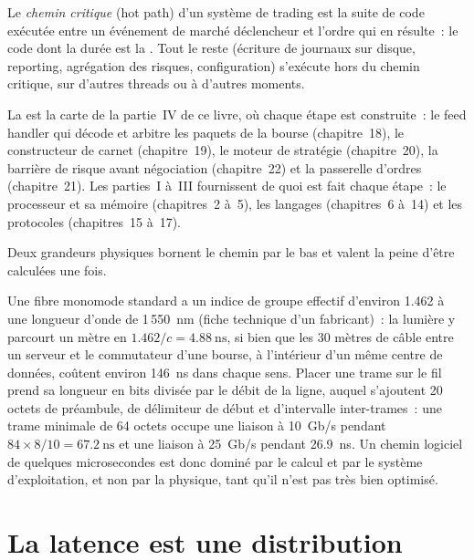 \begin{definition}\label{def:ll:where-latency-comes-from:hot}
Le \emph{chemin critique} (hot path) d'un système de trading est la suite de code exécutée entre un événement de marché déclencheur
et l'ordre qui en résulte~: le code dont la durée est la . Tout le reste (écriture de journaux sur disque, reporting, agrégation des risques, configuration)
s'exécute hors du chemin critique, sur d'autres threads ou à d'autres moments.
\end{definition}

La  est la carte de la partie~IV de ce livre, où chaque étape est construite~:
le feed handler qui décode et arbitre les paquets de la bourse (chapitre~18), le constructeur de carnet (chapitre~19),
le moteur de stratégie (chapitre~20), la barrière de risque avant négociation (chapitre~22) et la passerelle d'ordres (chapitre~21).
Les parties~I à~III fournissent de quoi est fait chaque étape~: le processeur et sa mémoire (chapitres~2 à~5), les langages
(chapitres~6 à~14) et les protocoles (chapitres~15 à~17).

Deux grandeurs physiques bornent le chemin par le bas et valent la peine d'être calculées une fois.

\begin{example}\label{ex:ll:where-latency-comes-from:physics}
Une fibre monomode standard a un indice de groupe effectif d'environ 1.462 à une longueur d'onde de 1\,550~nm (fiche
technique d'un fabricant)~: la lumière y parcourt un mètre en $1.462/c = \qty{4.88}{\nano\second}$, si bien que les 30 mètres
de câble entre un serveur et le commutateur d'une bourse, à l'intérieur d'un même centre de données, coûtent environ \qty{146}{\nano\second} dans chaque sens.
Placer une trame sur le fil prend sa longueur en bits divisée par le débit de la ligne, auquel s'ajoutent 20 octets de préambule,
de délimiteur de début et d'intervalle inter-trames~: une trame minimale de 64 octets occupe une liaison à 10~Gb/s pendant
$84 \times 8 / 10 = \qty{67.2}{\nano\second}$ et une liaison à 25~Gb/s pendant \qty{26.9}{\nano\second}. Un chemin logiciel
de quelques microsecondes est donc dominé par le calcul et par le système d'exploitation, et non par la physique,
tant qu'il n'est pas très bien optimisé.
\end{example}

\section{La latence est une distribution}

